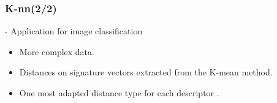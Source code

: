 \documentclass[xcolor=table]{beamer}
\begin{document}
\begin{frame}\frametitle{K-nn(2/2)}


- Application for image classification

\begin{itemize}
\item More complex data.
\item Distances on signature vectors extracted from the K-mean method.
\item One most adapted distance type for each descriptor .
\end{itemize}

\end{frame}
\end{document}
